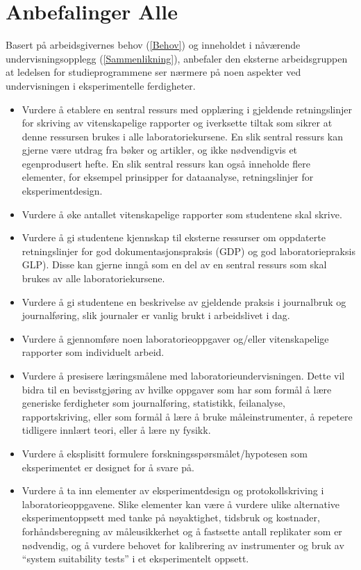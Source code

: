 \documentclass{article}
\begin{document}
\section{Anbefalinger {\color{red}Alle}}
Basert på arbeidsgivernes behov (\cref{Behov}) og inneholdet i nåværende undervisningsopplegg (\cref{Sammenlikning}), anbefaler den eksterne arbeidsgruppen at ledelsen for studieprogrammene ser nærmere på noen aspekter ved undervisningen i eksperimentelle ferdigheter.
\begin{itemize}
  \item Vurdere å etablere en sentral ressurs med opplæring i gjeldende retningslinjer for skriving av vitenskapelige rapporter og iverksette tiltak som sikrer at denne  ressursen brukes i alle laboratoriekursene. En slik sentral ressurs kan gjerne være utdrag fra bøker og artikler, og ikke nødvendigvis et egenprodusert hefte. En slik sentral ressurs kan også inneholde flere elementer, for eksempel prinsipper for dataanalyse, retningslinjer for eksperimentdesign. \item Vurdere å øke antallet vitenskapelige rapporter som studentene skal skrive. 
  \item Vurdere å gi studentene kjennskap til eksterne ressurser om oppdaterte retningslinjer for god dokumentasjonspraksis (GDP) og god laboratoriepraksis GLP). Disse kan gjerne inngå som en del av en sentral ressurs som skal brukes av alle laboratoriekursene.
  \item Vurdere å gi studentene en beskrivelse av gjeldende praksis i journalbruk og journalføring, slik journaler er vanlig brukt i arbeidslivet i dag.
  \item Vurdere å gjennomføre noen laboratorieoppgaver og/eller vitenskapelige rapporter som individuelt arbeid.
  \item Vurdere å presisere læringsmålene med laboratorieundervisningen. Dette vil bidra til en bevisstgjøring av hvilke oppgaver som har som formål å lære generiske ferdigheter som journalføring, statistikk, feilanalyse, rapportskriving, eller som formål å lære å bruke måleinstrumenter, å repetere tidligere innlært teori, eller å lære ny fysikk. 
  \item Vurdere å eksplisitt formulere forskningsspørsmålet/hypotesen som eksperimentet er designet for å svare på.
  \item Vurdere å ta inn elementer av eksperimentdesign og protokollskriving i laboratorieoppgavene. Slike elementer kan være å vurdere ulike alternative eksperimentoppsett med tanke på nøyaktighet, tidsbruk og kostnader, forhåndsberegning av måleusikkerhet og å fastsette antall replikater som er nødvendig, og å vurdere behovet for kalibrering av instrumenter og bruk av ``system suitability tests'' i et eksperimentelt oppsett.
\end{itemize}
\end{document}
